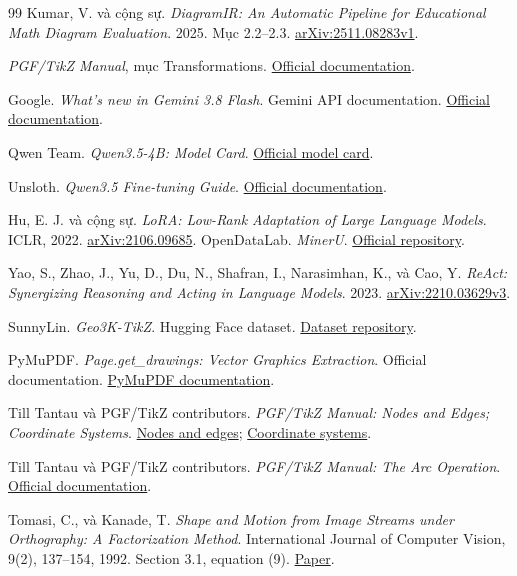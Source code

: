 \documentclass[a4paper,12pt]{article}
\begin{document}
\begin{thebibliography}{99}
 Kumar, V. và cộng sự. \emph{DiagramIR: An Automatic Pipeline for Educational Math Diagram Evaluation}. 2025. Mục 2.2–2.3. \href{https://arxiv.org/html/2511.08283v1#S2.SS3}{arXiv:2511.08283v1}.

 \emph{PGF/TikZ Manual}, mục Transformations. \href{https://tikz.dev/tikz-transformations}{Official documentation}.

 Google. \emph{What's new in Gemini 3.8 Flash}. Gemini API documentation. \href{https://ai.google.dev/gemini-api/docs/latest-model?hl=en}{Official documentation}.

 Qwen Team. \emph{Qwen3.5-4B: Model Card}. \href{https://huggingface.co/Qwen/Qwen3.5-4B}{Official model card}.

 Unsloth. \emph{Qwen3.5 Fine-tuning Guide}. \href{https://unsloth.ai/docs/models/qwen3.5/fine-tune}{Official documentation}.

 Hu, E. J. và cộng sự. \emph{LoRA: Low-Rank Adaptation of Large Language Models}. ICLR, 2022. \href{https://arxiv.org/abs/2106.09685}{arXiv:2106.09685}.
 OpenDataLab. \emph{MinerU}. \href{https://github.com/opendatalab/MinerU}{Official repository}.

 Yao, S., Zhao, J., Yu, D., Du, N., Shafran, I., Narasimhan, K., và Cao, Y. \emph{ReAct: Synergizing Reasoning and Acting in Language Models}. 2023. \href{https://arxiv.org/abs/2210.03629v3}{arXiv:2210.03629v3}.


 SunnyLin. \emph{Geo3K-TikZ}. Hugging Face dataset. \href{https://huggingface.co/datasets/SunnyLin/geo3k-tikz/tree/main}{Dataset repository}.


 PyMuPDF. \emph{Page.get\_drawings: Vector Graphics Extraction}. Official documentation. \href{https://pymupdf.readthedocs.io/en/latest/page.html\#Page.get_drawings}{PyMuPDF documentation}.

 Till Tantau và PGF/TikZ contributors. \emph{PGF/TikZ Manual: Nodes and Edges; Coordinate Systems}. \href{https://tikz.dev/tikz-shapes}{Nodes and edges}; \href{https://tikz.dev/tikz-coordinates}{Coordinate systems}.

 Till Tantau và PGF/TikZ contributors. \emph{PGF/TikZ Manual: The Arc Operation}. \href{https://tikz.dev/tikz-paths\#sec-14.7}{Official documentation}.

 Tomasi, C., và Kanade, T. \emph{Shape and Motion from Image Streams under Orthography: A Factorization Method}. International Journal of Computer Vision, 9(2), 137--154, 1992. Section 3.1, equation (9). \href{https://cs.brown.edu/courses/cs143/2011/proj5/Tomasi_Kanade_IJCV_1992.pdf}{Paper}.

\end{thebibliography}
\end{document}
